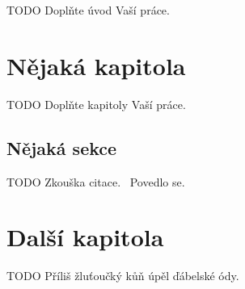 \begin{introduction}
	TODO Doplňte úvod Vaší práce.
\end{introduction}

\chapter{Nějaká kapitola}

TODO Doplňte kapitoly Vaší práce.

\section{Nějaká sekce}

TODO Zkouška citace.~\cite{rybicka} Povedlo se.

\chapter{Další kapitola}

TODO Příliš žluťoučký kůň úpěl ďábelské ódy.
